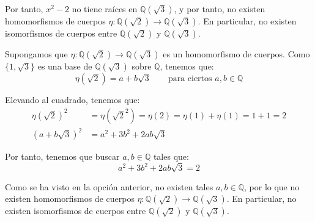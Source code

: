 \begin{ejercicio}
\begin{description}
        Por tanto, $x^2-2$ no tiene raíces en $\mathbb{Q}(\sqrt{3})$, y por tanto, no existen homomorfismos de cuerpos $\eta:\mathbb{Q}(\sqrt{2})\to \mathbb{Q}(\sqrt{3})$. En particular, no existen isomorfismos de cuerpos entre $\mathbb{Q}(\sqrt{2})$ y $\mathbb{Q}(\sqrt{3})$. 


        \item[Opción 2.] Supongamos que $\eta:\mathbb{Q}(\sqrt{2})\to \mathbb{Q}(\sqrt{3})$ es un homomorfismo de cuerpos. Como $\{1,\sqrt{3}\}$ es una base de $\mathbb{Q}(\sqrt{3})$ sobre $\mathbb{Q}$, tenemos que:
        \begin{equation*}
            \eta(\sqrt{2}) = a + b\sqrt{3} \qquad\text{para ciertos } a,b\in \mathbb{Q}
        \end{equation*}

        Elevando al cuadrado, tenemos que:
        \begin{align*}
            \eta(\sqrt{2})^2 &= \eta(\sqrt{2}^2) = \eta(2) = \eta(1) + \eta(1) = 1 + 1 = 2 \\
            (a+b\sqrt{3})^2 &= a^2 + 3b^2 + 2ab\sqrt{3}
        \end{align*}

        Por tanto, tenemos que buscar $a,b\in \mathbb{Q}$ tales que:
        \begin{equation*}
            a^2 + 3b^2 + 2ab\sqrt{3} = 2
        \end{equation*}

        Como se ha visto en la opción anterior, no existen tales $a,b\in \mathbb{Q}$, por lo que no existen homomorfismos de cuerpos $\eta:\mathbb{Q}(\sqrt{2})\to \mathbb{Q}(\sqrt{3})$. En particular, no existen isomorfismos de cuerpos entre $\mathbb{Q}(\sqrt{2})$ y $\mathbb{Q}(\sqrt{3})$.
    \end{description}
\end{ejercicio}